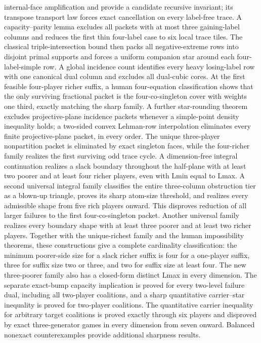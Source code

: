 \documentclass[11pt]{article}
\begin{document}
{internal-face amplification and provide a candidate recursive invariant; its
transpose transport law forces exact cancellation on every label-free trace.
A capacity--parity lemma excludes all packets with at most three gaining-label
columns and reduces the first thin four-label case to six local trace tiles.
The classical triple-intersection bound then packs all negative-extreme rows
into disjoint primal supports and forces a uniform companion star around each
four-label-simple row.  A global incidence count identifies every heavy
losing-label row with one canonical dual column and excludes all dual-cubic
cores.
At the first feasible four-player richer suffix, a human
four-equation classification shows that the only surviving fractional packet
is the four-co-singleton cover with weights one third, exactly matching the
sharp family.  A further star-rounding theorem excludes projective-plane
incidence packets whenever a simple-point density inequality holds; a
two-sided convex Lehman-row interpolation eliminates every finite
projective-plane packet, in every order.  The unique
three-player
nonpartition packet is eliminated by exact singleton faces, while the
four-richer family realizes the first surviving odd trace cycle.
A dimension-free integral continuation realizes a slack boundary
throughout the half-plane with at least two poorer and at least four richer
players, even with Lmin equal to Lmax.  A second universal integral family
classifies the entire three-column obstruction tier as a blown-up triangle,
proves its sharp atom-size threshold, and realizes every admissible shape
from five rich players onward.  This disproves reduction of all larger
failures to the first four-co-singleton packet.  Another universal family
realizes every boundary shape with at least three poorer and at least two
richer players.  Together with the unique-richest family and the human
impossibility theorems, these constructions give a complete cardinality
classification: the minimum poorer-side size for a slack richer suffix is
four for a one-player suffix, three for suffix size two or three, and two for
suffix size at least four.  The new three-poorer family also has a closed-form
distinct Lmax in every dimension.  The separate exact-bump capacity implication is
proved for every two-level failure dual, including all two-player coalitions,
and a sharp quantitative carrier--star inequality is proved for two-player coalitions.
The quantitative carrier inequality for arbitrary target coalitions is proved
exactly through six players and disproved by exact three-generator games in
every dimension from seven onward.
Balanced nonexact counterexamples provide additional sharpness results.}
\bigskip

\end{document}
